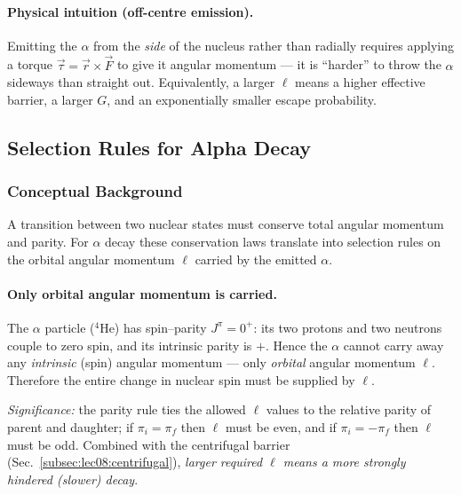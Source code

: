 \paragraph{Physical intuition (off-centre emission).}
Emitting the $\alpha$ from the \emph{side} of the nucleus rather than radially
requires applying a torque $\vec\tau = \vec r\times\vec F$ to give it angular
momentum --- it is ``harder'' to throw the $\alpha$ sideways than straight out.
Equivalently, a larger $\ell$ means a higher effective barrier, a larger $G$, and
an exponentially smaller escape probability.

\subsection{Selection Rules for Alpha Decay}
\label{subsec:lec08:selection}

\subsubsection*{Conceptual Background}
A transition between two nuclear states must conserve total angular momentum and
parity.  For $\alpha$ decay these conservation laws translate into selection
rules on the orbital angular momentum $\ell$ carried by the emitted $\alpha$.

\paragraph{Only orbital angular momentum is carried.}
The $\alpha$ particle ($^4$He) has spin--parity $J^\pi = 0^+$: its two protons
and two neutrons couple to zero spin, and its intrinsic parity is $+$.  Hence the
$\alpha$ cannot carry away any \emph{intrinsic} (spin) angular momentum --- only
\emph{orbital} angular momentum $\ell$.  Therefore the entire change in nuclear
spin must be supplied by $\ell$.

\textit{Significance:} the parity rule ties the allowed $\ell$ values to the
relative parity of parent and daughter; if $\pi_i = \pi_f$ then $\ell$ must be
even, and if $\pi_i = -\pi_f$ then $\ell$ must be odd.  Combined with the
centrifugal barrier (Sec.~\ref{subsec:lec08:centrifugal}), \emph{larger required
$\ell$ means a more strongly hindered (slower) decay}.

